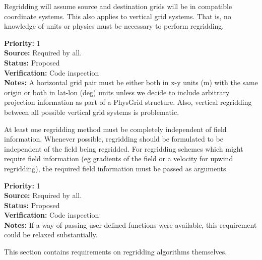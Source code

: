 Regridding will assume source and destination grids will be
in compatible coordinate systems.  This also applies to vertical
grid systems.
That is, no knowledge of units or physics must be necessary
to perform regridding.

\begin{reqlist}
{\bf Priority:} 1 \\
{\bf Source:} Required by all. \\
{\bf Status:} Proposed \\
{\bf Verification:} Code inspection  \\
{\bf Notes:} A horizontal grid pair must be either both in x-y units (m) 
             with the same origin or both in lat-lon (deg) units unless 
             we decide to include arbitrary projection information as part 
             of a PhysGrid structure. 
             Also, vertical regridding between all possible vertical grid 
             systems is problematic.
             \\
            
\end{reqlist}


At least one regridding method must be completely independent of
field information.  Whenever possible, regridding should be formulated to be 
independent of the field being regridded.  For regridding schemes which might 
require field information (eg gradients of the field or a velocity for 
upwind regridding), the required field information must be passed as arguments.

\begin{reqlist}
{\bf Priority:} 1 \\
{\bf Source:} Required by all. \\
{\bf Status:} Proposed \\
{\bf Verification:} Code inspection  \\
{\bf Notes:} If a way of passing user-defined functions
             were available, this requirement could be relaxed substantially.
\end{reqlist}


This section contains requirements on regridding algorithms themselves.

